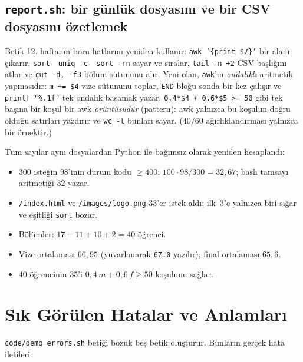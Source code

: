 \documentclass[11pt,a4paper]{article}
\newcommand{\cmd}[1]{\texttt{#1}}
\begin{document}
\subsection{\texttt{report.sh}: bir günlük dosyasını ve bir CSV dosyasını özetlemek}




Betik 12. haftanın boru hatlarını yeniden kullanır: \cmd{awk '\{print \$7\}'} bir alanı çıkarır, \cmd{sort \textbar\ uniq -c \textbar\ sort -rn} sayar ve sıralar, \cmd{tail -n +2} CSV başlığını atlar ve \cmd{cut -d, -f3} bölüm sütununu alır. Yeni olan, \cmd{awk}'ın \emph{ondalıklı} aritmetik yapmasıdır: \texttt{m += \$4} vize sütununu toplar, \texttt{END} bloğu sonda bir kez çalışır ve \texttt{printf "\%.1f"} tek ondalık basamak yazar. \texttt{0.4*\$4 + 0.6*\$5 >= 50} gibi tek başına bir koşul bir awk \emph{örüntüsüdür} (pattern): awk yalnızca bu koşulun doğru olduğu satırları yazdırır ve \cmd{wc -l} bunları sayar. ($40/60$ ağırlıklandırması yalnızca bir örnektir.)

\begin{example}
Tüm sayılar aynı dosyalardan Python ile bağımsız olarak yeniden hesaplandı:
\begin{itemize}
  \item $300$ isteğin $98$'inin durum kodu $\ge 400$: $100 \cdot 98 / 300 = 32{,}67$; bash tamsayı aritmetiği $32$ yazar.
  \item \texttt{/index.html} ve \texttt{/images/logo.png} $33$'er istek aldı; ilk~3'e yalnızca biri sığar ve eşitliği \cmd{sort} bozar.
  \item Bölümler: $17 + 11 + 10 + 2 = 40$ öğrenci.
  \item Vize ortalaması $66{,}95$ (yuvarlanarak \texttt{67.0} yazılır), final ortalaması $65{,}6$.
  \item $40$ öğrencinin $35$'i $0{,}4\,m + 0{,}6\,f \ge 50$ koşulunu sağlar.
\end{itemize}
\end{example}

\section{Sık Görülen Hatalar ve Anlamları}
\label{sec:errors}

\texttt{code/demo\_errors.sh} betiği bozuk beş betik oluşturur. Bunların gerçek hata iletileri:
\end{document}
